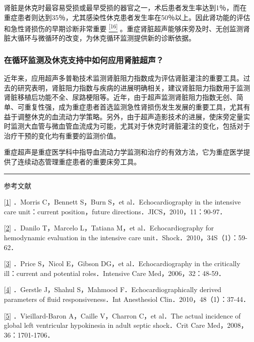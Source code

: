 肾脏是休克时最容易受损或最早受损的器官之一，术后患者发生率达到1％，而在重症患者则达到35％，尤其感染性休克患者发生率在50％以上。因此肾功能的评估和急性肾损伤的早期诊断非常重要
\protect\hyperlink{text00009.htmlux5cux23ch16-8}{\textsuperscript{{[}16{]}}}
。重症肾脏超声能够床旁及时、无创监测肾脏大循环与微循环的改变，为休克循环监测提供新的诊断依据。

\subsubsection{在循环监测及休克支持中如何应用肾脏超声？}

近年来，应用超声多普勒技术监测肾脏阻力指数成为评估肾脏灌注的重要工具。过去的研究表明，肾脏阻力指数与疾病的进展明确相关，建议肾脏阻力指数用于监测肾脏移植后功能不全、尿路梗阻等。近年，由于超声监测肾脏阻力指数无创、简单、可重复性强，成为重症患者首选监测急性肾损伤发生发展的重要工具，尤其有益于调整休克的血流动力学策略。另外，由于超声造影技术的进展，使床旁定量实时监测大血管与微血管血流成为可能，尤其对于休克时肾脏灌注的变化，包括对于治疗干预的变化均有重要的监测价值。

重症超声是重症医学科中指导血流动力学监测和治疗的有效方法，它为重症医学提供了连续动态管理重症患者的重要床旁工具。

\begin{center}\rule{0.5\linewidth}{\linethickness}\end{center}

参考文献

\protect\hyperlink{text00009.htmlux5cux23ch1-8-back}{{[}1{]}} ．Morris
C，Bennett S，Burn S，et al．Echocardiography in the intensive care
unit：current position，future directions．JICS，2010，11：90-97．

\protect\hyperlink{text00009.htmlux5cux23ch2-8-back}{{[}2{]}} ．Danilo
T，Marcelo L，Tatiana M，et al．Echocardiography for hemodynamic
evaluation in the intensive care unit．Shock．2010，34S（1）：59-62．

\protect\hyperlink{text00009.htmlux5cux23ch3-8-back}{{[}3{]}} ．Price
S，Nicol E，Gibson DG，et al．Echocardiography in the critically
ill：current and potential roles．Intensive Care Med，2006，32：48-59．

\protect\hyperlink{text00009.htmlux5cux23ch4-8-back}{{[}4{]}} ．Gerstle
J，Shahul S，Mahmood F．Echocardiographically derived parameters of
fluid responsiveness．Int Anesthesiol Clin．2010，48（1）：37-44．

\protect\hyperlink{text00009.htmlux5cux23ch5-8-back}{{[}5{]}}
．Vieillard-Baron A，Caille V，Charron C，et al．The actual incidence of
global left ventricular hypokinesia in adult septic shock．Crit Care
Med，2008，36：1701-1706．

